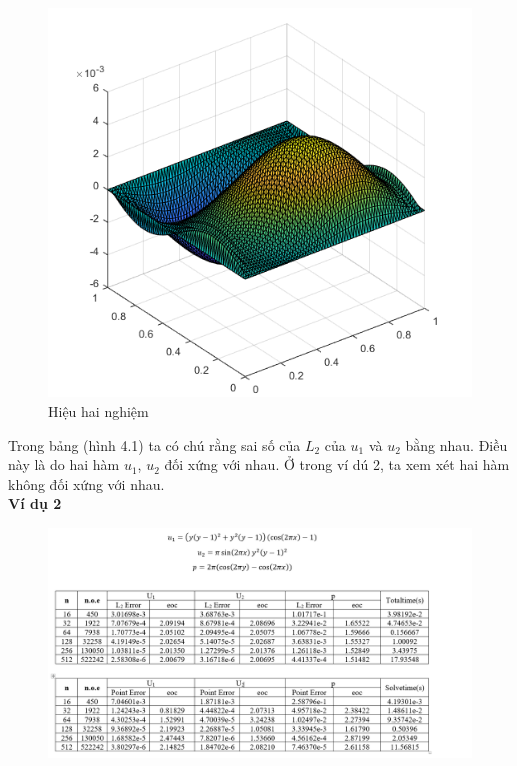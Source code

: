 \documentclass[14pt]{extreport}
\begin{document}
{\begin{figure}[h!]
\centering
\includegraphics[scale=0.7]{sub1}
\caption{ Hiệu hai nghiệm}
\end{figure}
\newpage
Trong bảng (hình 4.1) ta có chú rằng sai số của $L_2$ của $u_1$ và $u_2$ bằng nhau. Điều này là do hai hàm $u_1$, $u_2$ đối xứng với nhau. Ở trong ví dú 2, ta xem xét hai hàm không đối xứng với nhau. \\

\textbf{Ví dụ 2}
\begin{figure}[h!]
\centering
\includegraphics[scale=0.55]{VD2}
\caption{}
\end{figure}

}
\end{document}
